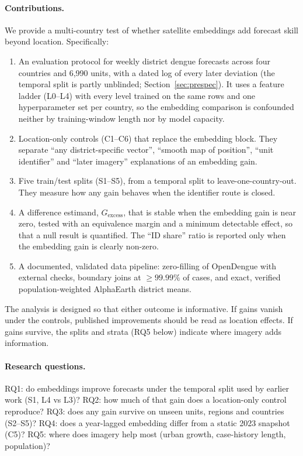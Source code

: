 \documentclass[11pt]{article}
\newcommand{\Gex}{G_{\mathrm{excess}}}
\begin{document}
\paragraph{Contributions.}
We provide a multi-country test of whether satellite embeddings add forecast skill beyond
location. Specifically:
\begin{enumerate}
  \item An evaluation protocol for weekly district dengue forecasts across four
  countries and 6{,}990 units, with a dated log of every later deviation (the temporal split is
  partly unblinded; Section~\ref{sec:prespec}). It uses a feature ladder
  (L0--L4) with every level trained on the same rows and one hyperparameter set per country, so
  the embedding comparison is confounded neither by training-window length nor by model capacity.
  \item Location-only controls (C1--C6) that replace the embedding block. They separate
  ``any district-specific vector'', ``smooth map of position'', ``unit identifier'' and ``later imagery''
  explanations of an embedding gain.
  \item Five train/test splits (S1--S5), from a temporal split to leave-one-country-out.
  They measure how any gain behaves when the identifier route is closed.
  \item A difference estimand, $\Gex$, that is stable when the embedding gain is near zero, tested
  with an equivalence margin and a minimum detectable effect, so that a null result is quantified.
  The ``ID share'' ratio is reported only when the embedding gain is clearly non-zero.
  \item A documented, validated data pipeline: zero-filling of OpenDengue with external checks,
  boundary joins at $\geq 99.99\%$ of cases, and exact, verified population-weighted AlphaEarth
  district means.
\end{enumerate}
The analysis is designed so that either outcome is informative. If gains vanish under the
controls, published improvements should be read as location effects. If gains survive,
the splits and strata (RQ5 below) indicate where imagery adds information.

\paragraph{Research questions.}
RQ1: do embeddings improve forecasts under the temporal split used by earlier work (S1, L4 vs L3)?
RQ2: how much of that gain does a location-only control reproduce?
RQ3: does any gain survive on unseen units, regions and countries (S2--S5)?
RQ4: does a year-lagged embedding differ from a static 2023 snapshot (C5)?
RQ5: where does imagery help most (urban growth, case-history length, population)?
\end{document}
